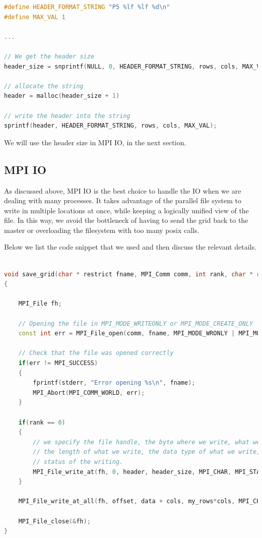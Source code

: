 \documentclass{report}
\begin{document}
\begin{lstlisting}[language=C++]
#define HEADER_FORMAT_STRING "P5 %lf %lf %d\n"
#define MAX_VAL 1

... 

// We get the header size 
header_size = snprintf(NULL, 0, HEADER_FORMAT_STRING, rows, cols, MAX_VAL);

// allocate the string
header = malloc(header_size + 1)

// write the header into the string
sprintf(header, HEADER_FORMAT_STRING, rows, cols, MAX_VAL);
\end{lstlisting}

We will use the header size in MPI IO, in the next section.

\subsection{MPI IO}

As discussed above, MPI IO is the best choice to handle the IO when we are 
dealing with many processes. It takes advantage of the parallel file system 
to write in multiple locations at once, while keeping a logically unified 
view of the file. In this way, we avoid the bottleneck of having to send the grid 
back to the master or overloading the filesystem with too many posix calls.

Below we list the code snippet that we used and then discuss the relevant details. 
\begin{lstlisting}[language=C++]

void save_grid(char * restrict fname, MPI_Comm comm, int rank, char * restrict header, unsigned long int header_size, MPI_Offset offset, unsigned char * restrict data, unsigned long int my_rows, unsigned long int cols)
{

    MPI_File fh;

    // Opening the file in MPI_MODE_WRITEONLY or MPI_MODE_CREATE_ONLY
    const int err = MPI_File_open(comm, fname, MPI_MODE_WRONLY | MPI_MODE_CREATE, MPI_INFO_NULL, &fh);

    // Check that the file was opened correctly
    if(err != MPI_SUCCESS)
    {
        fprintf(stderr, "Error opening %s\n", fname);
        MPI_Abort(MPI_COMM_WORLD, err);
    }
    
    if(rank == 0)
    {
        // we specify the file handle, the byte where we write, what we write, 
        // the length of what we write, the data type of what we write, and the 
        // status of the writing.
        MPI_File_write_at(fh, 0, header, header_size, MPI_CHAR, MPI_STATUS_IGNORE);
    }

    MPI_File_write_at_all(fh, offset, data + cols, my_rows*cols, MPI_CHAR, MPI_STATUS_IGNORE);

    MPI_File_close(&fh);
}

\end{lstlisting}
\end{document}
